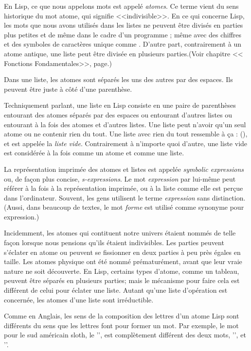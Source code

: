 En Lisp, ce que nous appelons mots est appelé \textit{atomes}. Ce
terme vient du sens historique du mot atome, qui signifie
<<indivisible>>. En ce qui concerne Lisp, les mots que nous avons
utilisés dans les listes ne peuvent être divisés en parties plus
petites et de même dans le cadre d'un programme ;
même avec des chiffres et des symboles de caractères unique comme
\citcom{+}. D'autre part, contrairement à un atome antique, une liste
peut être divisée en plusieurs parties.(Voir chapitre 
<< Fonctions Fondamentales>>, page.)

Dans une liste, les atomes sont séparés les uns des autres par des
espaces. Ils peuvent être juste à côté d'une parenthèse. 

Techniquement parlant, une liste en Lisp consiste en une paire de
parenthèses entourant des atomes séparés par des espaces ou entourant
d'autres listes ou entourant à la fois des atomes et d'autres
listes. Une liste peut n'avoir qu'un seul atome ou ne contenir rien du
tout. Une liste avec rien du tout ressemble à ça : (), et est appelée
la \textit{liste vide}. Contrairement à n'importe quoi d'autre, une
liste vide est considérée à la fois comme un atome et comme une liste.

La représentation imprimée des atomes et listes est appelée
\textit{symbolic expressions} ou, de façon plus concise,
\textit{s-expressions}. Le mot \textit{expression} par lui-même peut
référer à la fois à la représentation imprimée, ou à la liste comme
elle est perçue dans l'ordinateur. Souvent, les gens utilisent le
terme \textit{expression} sans distinction. (Aussi, dans beaucoup de
textes, le mot \textit{forme} est utilisé comme synonyme pour
expression.)

Incidemment, les atomes qui contituent notre univers étaient nommés
 de telle façon lorsque nous pensions qu'ils étaient indivisibles. Les parties
peuvent s'éclater en atome ou peuvent se fissionner en deux parties à
peu près égales en taille. Les atomes physique ont été nommé
prématurément, avant que leur vraie nature ne soit découverte. En
Lisp, certains types d'atome, comme un tableau, peuvent être séparés en
plusieurs parties; mais le mécanisme pour faire cela est différent de
celui pour éclater une liste. Autant qu'une liste d'opération est
concernée, les atomes d'une liste sont irréductible.

Comme en Anglais, les sens de la composition des lettres d'un atome
Lisp sont différents du sens que les lettres font pour former un mot. Par
exemple, le mot pour le sud américain sloth, le '', est
complètement différent des deux mots, '', et ''.

